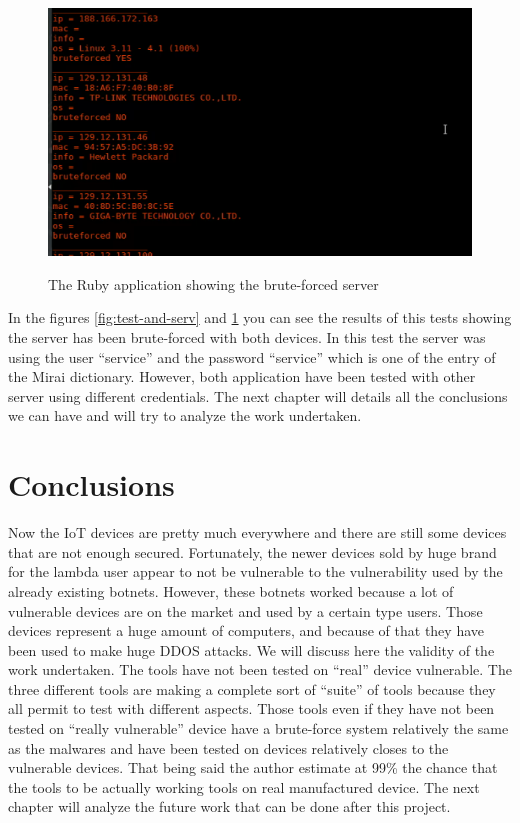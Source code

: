 \documentclass{report}
\begin{document}
\begin{figure}[h]
 \caption{The Ruby application showing the brute-forced server}
 \centering
 \includegraphics[width=1.2\textwidth]{./img/exp/screen-test-ruby}
 \label{fig:test-ruby-serv}
\end{figure}
In the figures \ref{fig:test-and-serv} and \ref{fig:test-ruby-serv} you can see the results of this tests showing the server has been brute-forced with both devices. In this test the server was using the user ``service'' and the password ``service'' which is one of the entry of the Mirai dictionary. However, both application have been tested with other server using different credentials.\newline
The next chapter will details all the conclusions we can have and will try to analyze the work undertaken.

\chapter{Conclusions}
Now the IoT devices are pretty much everywhere and there are still some devices that are not enough secured. Fortunately, the newer devices sold by huge brand for the lambda user appear to not be vulnerable to the vulnerability used by the already existing botnets. However, these botnets worked because a lot of vulnerable devices are on the market and used by a certain type users. Those devices represent a huge amount of computers, and because of that they have been used to make huge DDOS attacks. We will discuss here the validity of the work undertaken.\newline
The tools have not been tested on ``real'' device vulnerable.\newline
The three different tools are making a complete sort of ``suite'' of tools because they all permit to test with different aspects.\newline
Those tools even if they have not been tested on ``really vulnerable'' device have a brute-force system relatively the same as the malwares and have been tested on devices relatively closes to the vulnerable devices. That being said the author estimate at 99\% the chance that the tools to be actually working tools on real manufactured device.\newline
The next chapter will analyze the future work that can be done after this project.
\end{document}
